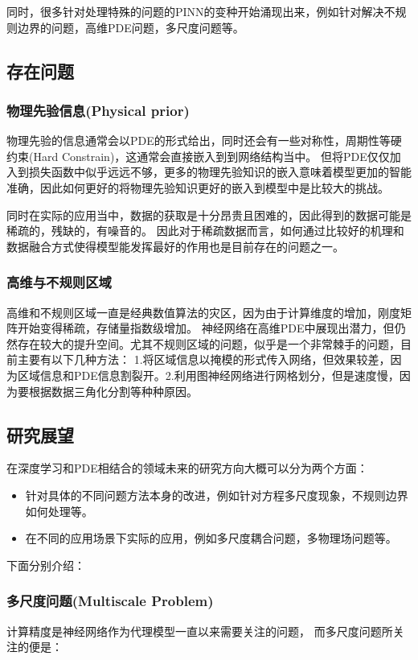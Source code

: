 同时，很多针对处理特殊的问题的PINN的变种开始涌现出来，例如针对解决不规则边界的问题，高维PDE问题，多尺度问题等。


\subsection{存在问题}
\subsubsection{物理先验信息(Physical prior)}
物理先验的信息通常会以PDE的形式给出，同时还会有一些对称性，周期性等硬约束(Hard Constrain)，这通常会直接嵌入到到网络结构当中。
但将PDE仅仅加入到损失函数中似乎远远不够，更多的物理先验知识的嵌入意味着模型更加的智能准确，因此如何更好的将物理先验知识更好的嵌入到模型中是比较大的挑战。

同时在实际的应用当中，数据的获取是十分昂贵且困难的，因此得到的数据可能是稀疏的，残缺的，有噪音的。
因此对于稀疏数据而言，如何通过比较好的机理和数据融合方式使得模型能发挥最好的作用也是目前存在的问题之一。

\subsubsection{高维与不规则区域}
高维和不规则区域一直是经典数值算法的灾区，因为由于计算维度的增加，刚度矩阵开始变得稀疏，存储量指数级增加。
神经网络在高维PDE中展现出潜力，但仍然存在较大的提升空间。尤其不规则区域的问题，似乎是一个非常棘手的问题，目前主要有以下几种方法：
1.将区域信息以掩模的形式传入网络，但效果较差，因为区域信息和PDE信息割裂开。2.利用图神经网络进行网格划分，但是速度慢，因为要根据数据三角化分割等种种原因。


\subsection{研究展望}
在深度学习和PDE相结合的领域未来的研究方向大概可以分为两个方面：

\begin{itemize}
    \item 针对具体的不同问题方法本身的改进，例如针对方程多尺度现象，不规则边界如何处理等。
    \item 在不同的应用场景下实际的应用，例如多尺度耦合问题，多物理场问题等。
\end{itemize}

下面分别介绍：

\subsubsection{多尺度问题(Multiscale Problem)}
计算精度是神经网络作为代理模型一直以来需要关注的问题，
而多尺度问题所关注的便是：


